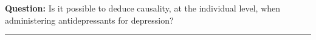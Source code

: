 \documentclass[12pt,letterpaper,doublespace, oneside]{article}
\begin{document}
\newcommand{\zz}{\mathbx Z}   %
\newcommand{\qq}{\mathbx Q}   %
\newcommand{\ff}{\mathbx F}   %
\newcommand{\rr}{\mathbx R}   %
\newcommand{\nn}{\mathbx N}   %
\newcommand{\cc}{\mathbx C}   %
\newcommand{\dd}{\mathsf D}   
\newcommand{\id}{\operatorname{id}} %
\newcommand{\im}{\operatorname{im}} %
\newcommand{\dom}{\operatorname{dom}} %
\newcommand{\abs}[1]{\left\lvert#1\right\rvert} %
\newcommand{\norm}[1]{\left\lVert#1\right\rVert} %
\newcommand{\modar}[1]{\operatorname{mod}{#1}} %
\newcommand{\set}[1]{\left\{#1\right\}} %
\newcommand{\setp}[2]{\left\{#1\ :\ #2\right\}} %
\newcommand{\lag}{\mathcal{L}}

\renewcommand\thepage{}

\renewcommand{\epsilon}{\varepsilon}
\renewcommand{\phi}{\varphi}
\renewcommand{\emptyset}{\varnothing}
\renewcommand{\geq}{\geqslant}
\renewcommand{\leq}{\leqslant}
\renewcommand{\Re}{\operatorname{Re}}
\renewcommand{\Im}{\operatorname{Im}}


\theoremstyle{theorem}
\newtheorem{theorem}{Theorem}
\theoremstyle{proposition}
\newtheorem{proposition}{Proposition}
\theoremstyle{definition}
\newtheorem{definition}{Definition}
\theoremstyle{lemma}
\newtheorem{lemma}[theorem]{Lemma}
\theoremstyle{corollary}
\newtheorem{corollary}[theorem]{Corollary}
\theoremstyle{example}
\newtheorem{example}[theorem]{Example}
\theoremstyle{remark}
\newtheorem{remark}[theorem]{Remark}
\theoremstyle{conclusion}
\newtheorem{conclusion}[theorem]{Conclusion}


\noindent
\textbf{Question:} Is it possible to deduce causality, at the individual level, when administering antidepressants for depression? 

\noindent\rule{\linewidth}{0.4pt}
\end{document}
